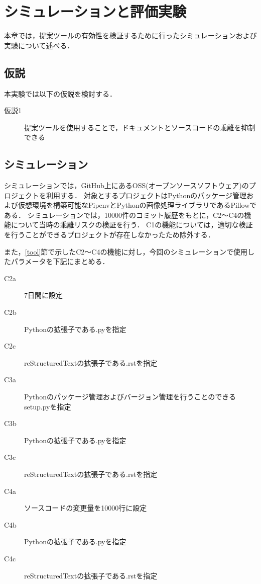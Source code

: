 \chapter{シミュレーションと評価実験}
本章では，提案ツールの有効性を検証するために行ったシミュレーションおよび実験について述べる．

\section{仮説}
本実験では以下の仮説を検討する．

\begin{description}
    \item[仮説1] 提案ツールを使用することで，ドキュメントとソースコードの乖離を抑制できる
\end{description}

\section{シミュレーション}
\label{sim}
シミュレーションでは，GitHub上にあるOSS(オープンソースソフトウェア)のプロジェクトを利用する．
対象とするプロジェクトはPythonのパッケージ管理および仮想環境を構築可能なPipenv\cite{pipenv}とPythonの画像処理ライブラリであるPillow\cite{pillow}である．
シミュレーションでは，10000件のコミット履歴をもとに，C2〜C4の機能について当時の乖離リスクの検証を行う．
C1の機能については，適切な検証を行うことができるプロジェクトが存在しなかったため除外する．

また，\ref{tool}節で示したC2〜C4の機能に対し，今回のシミュレーションで使用したパラメータを下記にまとめる．
\begin{description}
    \item[C2a] 7日間に設定
    \item[C2b] Pythonの拡張子である.pyを指定
    \item[C2c] reStructuredTextの拡張子である.rstを指定 
    \item[C3a] Pythonのパッケージ管理およびバージョン管理を行うことのできるsetup.pyを指定
    \item[C3b] Pythonの拡張子である.pyを指定
    \item[C3c] reStructuredTextの拡張子である.rstを指定
    \item[C4a] ソースコードの変更量を10000行に設定
    \item[C4b] Pythonの拡張子である.pyを指定
    \item[C4c] reStructuredTextの拡張子である.rstを指定
\end{description}

